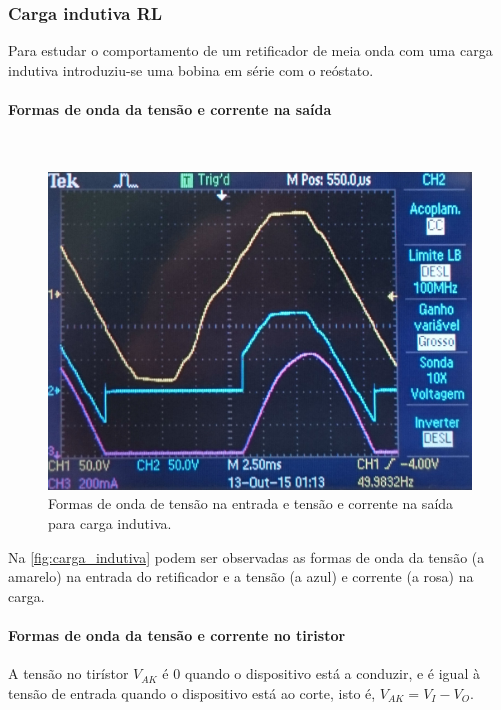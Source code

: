 \documentclass[a4paper,11pt]{article}
\numberwithin{equation}{section}
\begin{document}
\subsubsection{Carga indutiva RL}

Para estudar o comportamento de um retificador de meia onda com uma carga indutiva introduziu-se uma bobina em série com o reóstato.

\paragraph{Formas de onda da tensão e corrente na saída}\mbox{}\

\begin{figure}[h]
	\centering
	\includegraphics[keepaspectratio=true, scale=0.13]{img/figs/carga_indutiva}
	\caption{Formas de onda de tensão na entrada e tensão e corrente na saída para carga indutiva.}
	\label{fig:carga_indutiva}
	\vspace{-0.8em}
\end{figure}

Na \autoref{fig:carga_indutiva} podem ser observadas as formas de onda da tensão (a amarelo) na entrada do retificador e a tensão (a azul) e corrente (a rosa) na carga.

\paragraph{Formas de onda da tensão e corrente no tiristor}

A tensão no tirístor $V_{AK}$ é $0$ quando o dispositivo está a conduzir, e é igual à tensão de entrada quando o dispositivo está ao corte, isto é, $V_{AK} = V_I - V_O$.
\end{document}
